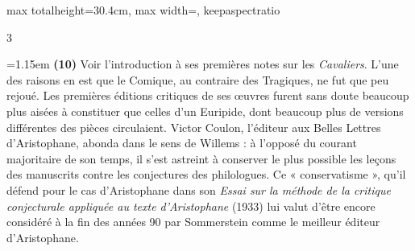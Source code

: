 \documentclass[11pt,twoside]{book}
\newcommand{\currHeadLE}{}
\newcommand{\currHeadRE}{}
\newcommand{\currHeadLO}{}
\newcommand{\currHeadRO}{}
\newcommand{\italique}[1]{\textit{#1}}
\newcommand{\R}{\textbf{R}}
\begin{document}
\begin{adjustbox}{max totalheight=30.4cm, max width=\textwidth, keepaspectratio}
\begin{minipage}{\textwidth}
{\begin{multicols}{3}
\par\vspace{1.5pt}
\noindent\hangindent=1.15em {\color{sepiaNote}\textbf{(10)}} Voir l'introduction à ses premières notes sur les \italique{Cavaliers}. L'une des raisons en est que le Comique, au contraire des Tragiques, ne fut que peu rejoué. Les premières éditions critiques de ses œuvres furent sans doute beaucoup plus aisées à constituer que celles d'un Euripide, dont beaucoup plus de versions différentes des pièces circulaient. Victor Coulon, l'éditeur aux Belles Lettres d'Aristophane, abonda dans le sens de Willems : à l’opposé du courant majoritaire de son temps, il s'est astreint à conserver le plus possible les leçons des manuscrits contre les conjectures des philologues. Ce « conservatisme », qu'il défend pour le cas d'Aristophane dans son \italique{Essai sur la méthode de la critique conjecturale appliquée au texte d’Aristophane} (1933) lui valut d’être encore considéré à la fin des années 90 par Sommerstein comme le meilleur éditeur d’Aristophane.
\par\end{multicols}}
\end{minipage}\end{adjustbox}
\clearpage\ifodd\value{page}\hbox{}\newpage\fi
\renewcommand{\currHeadLE}{ΑΡΙΣΤΟΦΑΝΟΥΣ ΘΕΣΜΟΦΟΡΙΑΖΟΥΣΑΙ · CODEX RAVENNAS 429 (\R)}
\renewcommand{\currHeadRE}{Folio f. 164v (Classense 166v) · vv. 165–207}
\renewcommand{\currHeadLO}{FAC-SIMILÉ DU CODEX RAVENNAS 429 (\R) · f. 164v (Classense 166v)}
\renewcommand{\currHeadRO}{vv. 165–207 · Planche recadrée sur la zone écrite et harmonisée}
\end{document}
